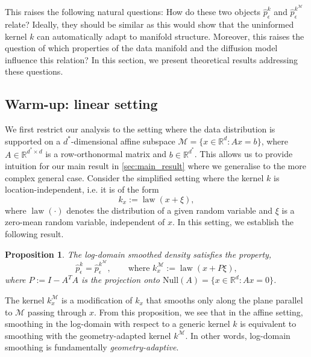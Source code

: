 \documentclass[10pt]{article}
\theoremstyle{plain}
\newtheorem{proposition}[theorem]{Proposition}
\theoremstyle{definition}
\theoremstyle{remark}
\newcommand{\M}{{\mathcal{M}}}
\newcommand{\R}{\mathbb{R}}
\newcommand{\law}{\operatorname{law}}
\begin{document}
This raises the following natural questions: How do these two objects $\hat{p}_\epsilon^k$ and $\hat{p}_\epsilon^{k^\mathcal{M}}$ relate? Ideally, they should be similar as this would show that the uninformed kernel $k$ can automatically adapt to manifold structure. Moreover, this raises the question of which properties of the data manifold and the diffusion model influence this relation?
In this section, we present theoretical results addressing these questions.


\subsection{Warm-up: linear setting}\label{sec:warmup}
We first restrict our analysis to the setting where the data distribution is supported on a \(d^*\)-dimensional affine subspace \(\M = \{x \in \R^d: Ax = b\}\), where \(A \in \R^{d^* \times d}\) is a row-orthonormal matrix and \(b \in \R^{d^*}\). This allows us to provide intuition for our main result in \cref{sec:main_result} where we generalise to the more complex general case. Consider the simplified setting where the kernel $k$ is location-independent, i.e. it is of the form
\begin{equation*}
    k_x := \law(x + \xi),
\end{equation*}
where \(\law(\cdot)\) denotes the distribution of a given random variable and \(\xi\) is a zero-mean random variable, independent of \(x\). In this setting, we establish the following result.
\begin{proposition}\label{prop:linear_result}
The log-domain smoothed density satisfies the property,
\begin{equation}\label{eq:warmup_manifold_kernel}
    \hat{p}^k_\epsilon = \hat{p}^{k^\M}_\epsilon, \qquad \text{where } k^{\M}_x := \law(x + P\xi),
\end{equation}
where \(P := I-A^T A\) is the projection onto $\text{Null}(A) =  \{x \in \R^d: Ax = 0\}$.
\end{proposition}
The kernel \(k^{\M}_x\) is a modification of \(k_x\) that smooths only along the plane parallel to $\M$ passing through $x$. From this proposition, we see that in the affine setting, smoothing in the log-domain with respect to a generic kernel \(k\) is equivalent to smoothing with the geometry-adapted kernel \(k^\M\). In other words, log-domain smoothing is fundamentally \textit{geometry-adaptive}.
\end{document}
